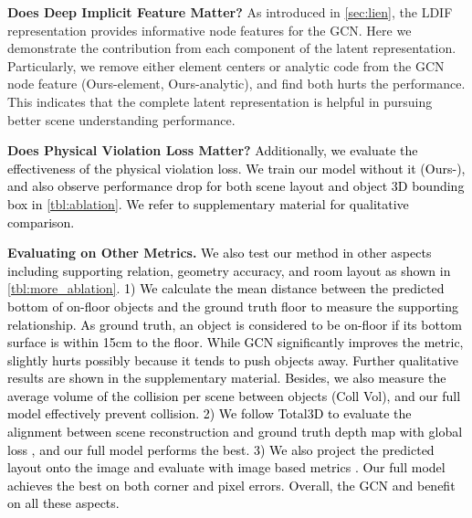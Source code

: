 \documentclass[final]{cvpr}
\newcommand{\zc}[1]{\textcolor{black}{{#1}}}
\let\orgautoref\autoref
\renewcommand{\autoref}[1]{\def\figureautorefname{Fig.}\orgautoref{#1}}
\begin{document}
\noindent \textbf{Does Deep Implicit Feature Matter?}
As introduced in \autoref{sec:lien}, the LDIF representation provides informative node features for the GCN.
Here we demonstrate the contribution from each component of the latent representation.
Particularly, we remove either element centers or analytic code from the GCN node feature (Ours-element, Ours-analytic), and find both hurts the performance.
This indicates that the complete latent representation is helpful in pursuing better scene understanding performance.

\noindent \textbf{Does Physical Violation Loss Matter?}
\zc{
Additionally, 
we evaluate the effectiveness of the physical violation loss.
We train our model without it (Ours-), and also observe performance drop 
for both scene layout and object 3D bounding box 
in \autoref{tbl:ablation}.
We refer to supplementary material for qualitative comparison.
}

\noindent \textbf{Evaluating on Other Metrics.}
\zc{
We also test our method in other aspects including supporting relation, geometry accuracy, and room layout as shown in \autoref{tbl:more_ablation}.
1) We calculate the mean distance between the predicted bottom of on-floor objects and the ground truth floor to measure the supporting relationship.
As ground truth, an object is considered to be on-floor if its bottom surface is within 15cm to the floor.
While GCN significantly improves the metric,  slightly hurts possibly because it tends to push objects away.
Further qualitative results are shown in the supplementary material.
Besides, we also measure the average volume of the collision per scene between objects (Coll Vol), and our full model effectively prevent collision.
2) We follow Total3D \cite{nie2020total3dunderstanding} to evaluate the alignment between scene reconstruction and ground truth depth map with global loss , and our full model performs the best.
3) We also project the predicted layout onto the image and evaluate with image based metrics \cite{dasgupta2016delay, ren2016coarse}.
Our full model achieves the best on both corner and pixel errors.
Overall, the GCN and  benefit on all these aspects.
}
\end{document}
